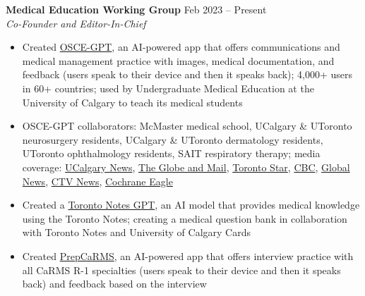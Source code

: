 \documentclass{article}
\begin{document}
\textbf{Medical Education Working Group} \hfill Feb 2023 -- Present \\
\textit{Co-Founder and Editor-In-Chief}
\begin{itemize}
    \item Created \href{https://oscegpt.com/}{OSCE-GPT}, an AI-powered app that offers communications and medical management practice with images, medical documentation, and feedback (users speak to their device and then it speaks back); 4,000+ users in 60+ countries; used by Undergraduate Medical Education at the University of Calgary to teach its medical students
    \item OSCE-GPT collaborators: McMaster medical school, UCalgary \& UToronto neurosurgery residents, UCalgary \& UToronto dermatology residents, UToronto ophthalmology residents, SAIT respiratory therapy; media coverage: \href{https://cumming.ucalgary.ca/news/ucalgary-students-create-app-help-medical-students-learn-how-talk-patients}{UCalgary News}, \href{https://www.theglobeandmail.com/canada/alberta/article-new-app-uses-ai-to-help-calgary-medical-students-practise-interacting/}{The Globe and Mail}, \href{https://www.thestar.com/news/canada/new-app-uses-ai-to-help-calgary-medical-students-practise-interacting-with-patients/article_e24a869c-58f4-58ee-99ea-666e2bc65f27.amp.html}{Toronto Star}, \href{https://www.cbc.ca/amp/1.6975645}{CBC}, \href{https://globalnews.ca/news/9978614/new-app-uses-ai-medical-students-practise-interacting-patients/}{Global News}, \href{https://calgary.ctvnews.ca/new-app-uses-ai-to-help-calgary-medical-students-practise-interacting-with-patients-1.6573065?utm_source=ground.news&utm_medium=referral}{CTV News}, \href{https://www.cochraneeagle.ca/alberta-news/new-app-uses-ai-to-help-calgary-medical-students-practise-interacting-with-patients-7583920}{Cochrane Eagle}
    \item Created a \href{https://chat.openai.com/g/g-cewxRzfa6-toronto-notes}{Toronto Notes GPT}, an AI model that provides medical knowledge using the Toronto Notes; creating a medical question bank in collaboration with Toronto Notes and University of Calgary Cards
    \item Created \href{https://prepcarms.netlify.app/}{PrepCaRMS}, an AI-powered app that offers interview practice with all CaRMS R-1 specialties (users speak to their device and then it speaks back) and feedback based on the interview

\end{itemize}
\end{document}
